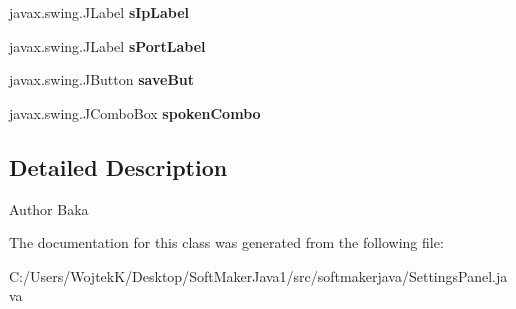 \begin{DoxyCompactItemize}
\item 
javax.\+swing.\+J\+Label {\bfseries s\+Ip\+Label}\hypertarget{classsoftmakerjava_1_1_settings_panel_a9d17ddd726cba4de0e3dd3cd21f488c9}{}\label{classsoftmakerjava_1_1_settings_panel_a9d17ddd726cba4de0e3dd3cd21f488c9}

\item 
javax.\+swing.\+J\+Label {\bfseries s\+Port\+Label}\hypertarget{classsoftmakerjava_1_1_settings_panel_a34e0c46ff07c9fcfa5fff302decd55e9}{}\label{classsoftmakerjava_1_1_settings_panel_a34e0c46ff07c9fcfa5fff302decd55e9}

\item 
javax.\+swing.\+J\+Button {\bfseries save\+But}\hypertarget{classsoftmakerjava_1_1_settings_panel_a52e188c20815bfd1e08610a615853aa3}{}\label{classsoftmakerjava_1_1_settings_panel_a52e188c20815bfd1e08610a615853aa3}

\item 
javax.\+swing.\+J\+Combo\+Box {\bfseries spoken\+Combo}\hypertarget{classsoftmakerjava_1_1_settings_panel_ad65ff8e0db0a961481fa8b15672073b7}{}\label{classsoftmakerjava_1_1_settings_panel_ad65ff8e0db0a961481fa8b15672073b7}

\end{DoxyCompactItemize}


\subsection{Detailed Description}
\begin{DoxyAuthor}{Author}
Baka 
\end{DoxyAuthor}


The documentation for this class was generated from the following file\+:\begin{DoxyCompactItemize}
\item 
C\+:/\+Users/\+Wojtek\+K/\+Desktop/\+Soft\+Maker\+Java1/src/softmakerjava/Settings\+Panel.\+java\end{DoxyCompactItemize}
